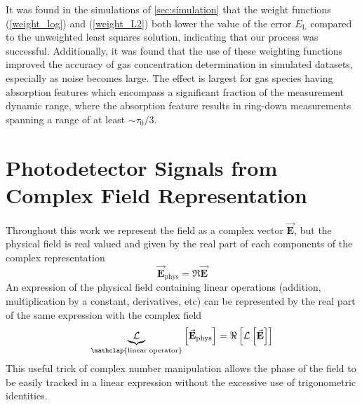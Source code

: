 It was found in the simulations of \ref{sec:simulation} that the weight functions (\ref{weight_log}) and (\ref{weight_L2}) both lower the value of the error $E_\mathrm{L}$ compared to the unweighted least squares solution, indicating that our process was successful. Additionally, it was found that the use of these weighting functions improved the accuracy of gas concentration determination in simulated datasets, especially as noise becomes large. The effect is largest for gas species having absorption features which encompass a significant fraction of the measurement dynamic range, where the absorption feature results in ring-down measurements spanning a range of at least $\sim \tau_0/3$.

\section{Photodetector Signals from Complex Field Representation} \label{append_intens}	
Throughout this work we represent the field as a complex vector $\vec{\mathbf{E}}$, but the physical field is real valued and given by the real part of each components of the complex representation
\begin{equation}
	\vec{\mathbf{E}}_\mathrm{phys} = \Re \vec{\mathbf{E}}
\end{equation}
An expression of the physical field containing linear operations (addition, multiplication by a constant, derivatives, etc) can be represented by the real part of the same expression with the complex field
\begin{equation} \label{append_complex_field}
	\underbrace{\mathcal{L}}_{\mathclap{\mathrm{linear\; operator}}}\left[\vec{\mathbf{E}}_\mathrm{phys}\right] = \Re\left[\mathcal{L}\left[\vec{\mathbf{E}}\right]\right]
\end{equation}
This useful trick of complex number manipulation allows the phase of the field to be easily tracked in a linear expression without the excessive use of trigonometric identities.

